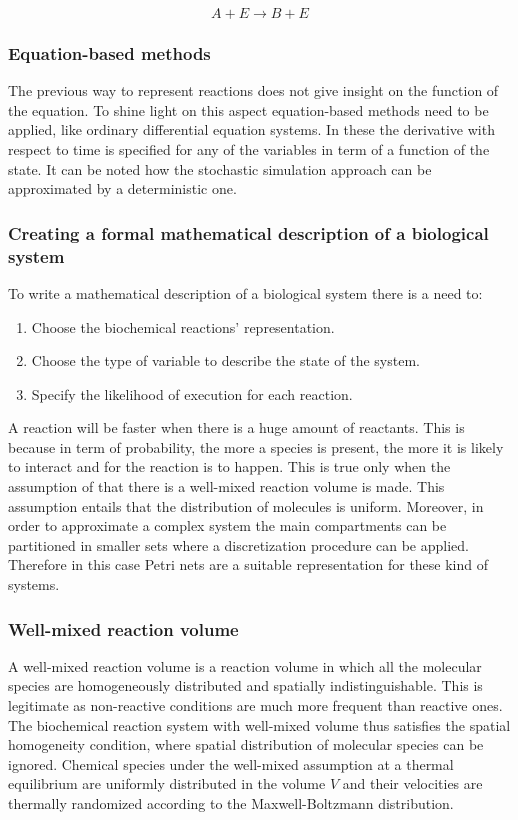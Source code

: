         $$A+E\rightarrow B+E$$

    \subsubsection{Equation-based methods}
    The previous way to represent reactions does not give insight on the function of the equation.
    To shine light on this aspect equation-based methods need to be applied, like ordinary differential equation systems.
    In these the derivative with respect to time is specified for any of the variables in term of a function of the state.
    It can be noted how the stochastic simulation approach can be approximated by a deterministic one.

    \subsubsection{Creating a formal mathematical description of a biological system}
    To write a mathematical description of a biological system there is a need to:

    \begin{enumerate}
      \item Choose the biochemical reactions' representation.
      \item Choose the type of variable to describe the state of the system.
      \item Specify the likelihood of execution for each reaction.
    \end{enumerate}

    A reaction will be faster when there is a huge amount of reactants.
    This is because in term of probability, the more a species is present, the more it is likely to interact and for the reaction is to happen.
    This is true only when the assumption of that there is a well-mixed reaction volume is made.
    This assumption entails that the distribution of molecules is uniform.
    Moreover, in order to approximate a complex system the main compartments can be partitioned in smaller sets where a discretization procedure can be applied.
    Therefore in this case Petri nets are a suitable representation for these kind of systems.

    \subsubsection{Well-mixed reaction volume}
    A well-mixed reaction volume is a reaction volume in which all the molecular species are homogeneously distributed and spatially indistinguishable.
    This is legitimate as non-reactive conditions are much more frequent than reactive ones.
    The biochemical reaction system with well-mixed volume thus satisfies the spatial homogeneity condition, where spatial distribution of molecular species can be ignored.
    Chemical species under the well-mixed assumption at a thermal equilibrium are uniformly distributed in the volume $V$ and their velocities are thermally randomized according to the Maxwell-Boltzmann distribution.

